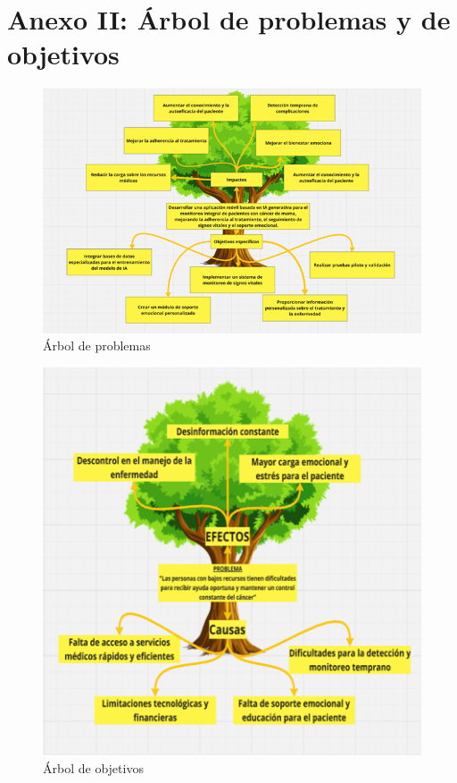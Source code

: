 \chapter{Anexo II: Árbol de problemas y de objetivos}

\begin{figure}[ht]
	\centering
	\includegraphics[width=1.1\textwidth]{anexos/Imagen1.png}
	\caption{Árbol de problemas}
	\label{8:fig}
\end{figure}

\begin{figure}[ht]
	\centering
	\includegraphics[width=1.1\textwidth]{anexos/Imagen2.png}
	\caption{Árbol de objetivos}
	\label{8:fig}
\end{figure}

